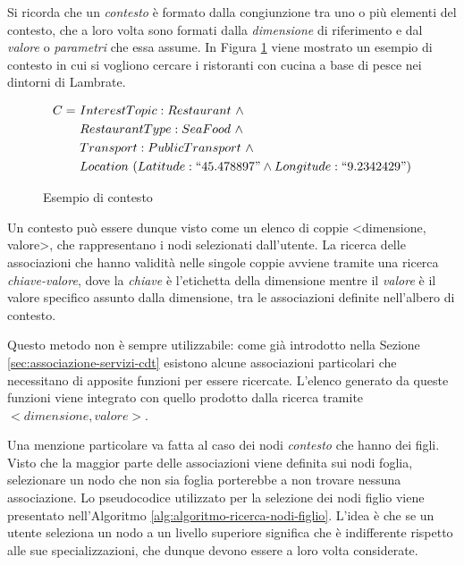 Si ricorda che un \emph{contesto} è formato dalla congiunzione tra uno o più elementi del contesto, che a loro volta sono formati dalla \emph{dimensione} di riferimento e dal \emph{valore} o \emph{parametri} che essa assume. In Figura \ref{fig:esempio-contesto} viene mostrato un esempio di contesto in cui si vogliono cercare i ristoranti con cucina a base di pesce nei dintorni di Lambrate.

\begin{figure}[ht]
	\begin{align*}
	C =\ &InterestTopic : Restaurant\ \land \\
	&RestaurantType : SeaFood\ \land \\
	&Transport : PublicTransport\ \land \\
	&Location\ (Latitude : ``45.478897" \land Longitude : ``9.2342429")
	\end{align*}
	\caption{Esempio di contesto\label{fig:esempio-contesto}}
\end{figure}

Un contesto può essere dunque visto come un elenco di coppie {<}dimensione, valore{>}, che rappresentano i nodi selezionati dall'utente. La ricerca delle associazioni che hanno validità nelle singole coppie avviene tramite una ricerca \emph{chiave-valore}, dove la \emph{chiave} è l'etichetta della dimensione mentre il \emph{valore} è il valore specifico assunto dalla dimensione, tra le associazioni definite nell'albero di contesto.

Questo metodo non è sempre utilizzabile: come già introdotto nella Sezione \ref{sec:associazione-servizi-cdt} esistono alcune associazioni particolari che necessitano di apposite funzioni per essere ricercate. L'elenco generato da queste funzioni viene integrato con quello prodotto dalla ricerca tramite $ {<}dimensione, valore{>} $.

Una menzione particolare va fatta al caso dei nodi \emph{contesto} che hanno dei figli. Visto che la maggior parte delle associazioni viene definita sui nodi foglia, selezionare un nodo che non sia foglia porterebbe a non trovare nessuna associazione. Lo pseudocodice utilizzato per la selezione dei nodi figlio viene presentato nell'Algoritmo \ref{alg:algoritmo-ricerca-nodi-figlio}. L'idea è che se un utente seleziona un nodo a un livello superiore significa che è indifferente rispetto alle sue specializzazioni, che dunque devono essere a loro volta considerate.

